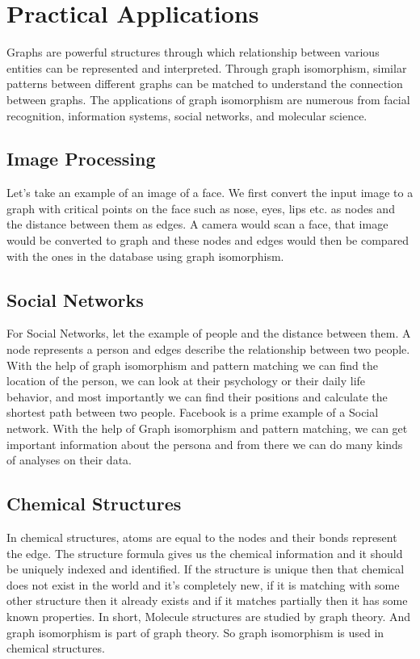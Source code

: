 \documentclass[11pt]{article}
\begin{document}
\section{Practical Applications}
\label{sec:length}

Graphs are powerful structures through which relationship between various entities can be represented and interpreted. Through graph isomorphism, similar patterns between different graphs can be matched to understand the connection between graphs. The applications of graph isomorphism are numerous \cite{somkunwar2017comparative} from facial recognition, information systems, social networks, and molecular science. 

\subsection{Image Processing}
Let's take an example of an image of a face. We first convert the input image to a graph with critical points on the face such as nose, eyes, lips etc. as nodes and the distance between them as edges. A camera would scan a face, that image would be converted to graph and these nodes and edges would then be compared with the ones in the database using graph isomorphism. 

\subsection{Social Networks}
For Social Networks, let the example of people and the distance between them. A node represents a person and edges describe the relationship between two people. With the help of graph isomorphism and pattern matching we can find the location of the person, we can look at their psychology or their daily life behavior, and most importantly we can find their positions and calculate the shortest path between two people. Facebook is a prime example of a Social network. With the help of Graph isomorphism and pattern matching, we can get important information about the persona and from there we can do many kinds of analyses on their data.

\subsection{Chemical Structures}
In chemical structures, atoms are equal to the nodes and their bonds represent the edge. The structure formula gives us the chemical information and it should be uniquely indexed and identified. If the structure is unique then that chemical does not exist in the world and it's completely new, if it is matching with some other structure then it already exists and if it matches partially then it has some known properties. In short, Molecule structures are studied by graph theory. And graph isomorphism is part of graph theory. So graph isomorphism is used in chemical structures.\\
\end{document}
